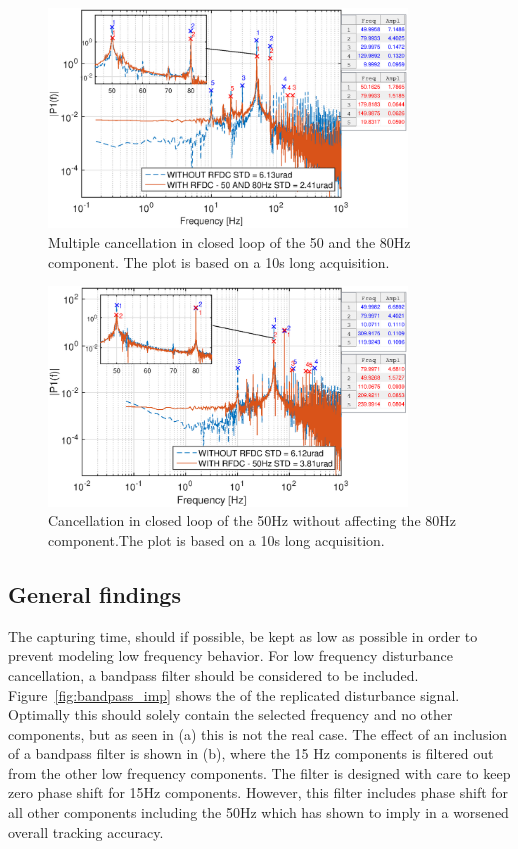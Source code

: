 \begin{figure}[h]
  \centering %
  \includegraphics[width=0.85\textwidth]{fig/matlab/mult_50_80_closed_loop}
  \caption{\label{fig:mult5080} Multiple cancellation in closed loop of the 50 and the 80Hz component. The plot is based on a 10s long acquisition.}
\end{figure}

\begin{figure}[h]
  \centering %
  \includegraphics[width=0.85\textwidth]{fig/matlab/mult_50_selected_closed_loop}
  \caption{\label{fig:mult50no80} Cancellation in closed loop of the 50Hz without affecting the 80Hz component.The plot is based on a 10s long acquisition.}
\end{figure}

\FloatBarrier
\subsection{General findings}\label{subsec:longterm}
The capturing time, should if possible, be kept as low as possible in order to prevent modeling low frequency behavior. For low frequency disturbance cancellation, a bandpass filter should be considered to be included. Figure~\ref{fig:bandpass_imp} shows the \abbrFFT of the replicated disturbance signal. Optimally this should solely contain the selected frequency and no other components, but as seen in (a) this is not the real case. The effect of an inclusion of a bandpass filter is shown in (b), where the 15 Hz components is filtered out from the other low frequency components. The filter is designed with care to keep zero phase shift for 15Hz components. However, this filter includes phase shift for all other components including the 50Hz which has shown to imply in a worsened overall tracking accuracy.


